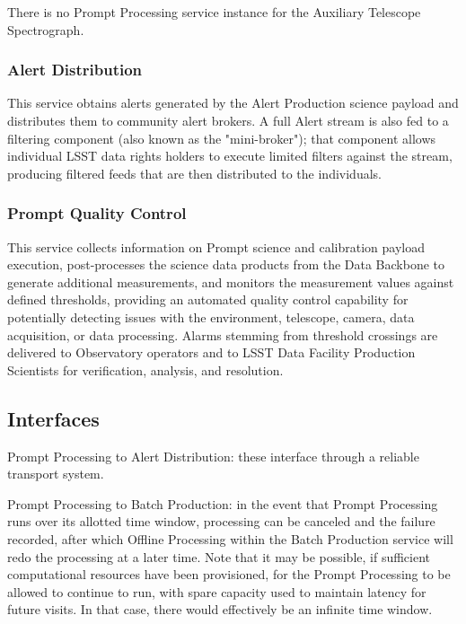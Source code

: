 \documentclass[DM,toc,lsstdraft]{lsstdoc}
\begin{document}
There is no Prompt Processing service instance for the Auxiliary
Telescope Spectrograph.

\subsubsection{Alert Distribution}\label{alert-distribution}

This service obtains alerts generated by the Alert Production science payload and distributes them to community alert brokers.
A full Alert stream is also fed to a filtering component (also known as the "mini-broker"); that component allows individual LSST data rights holders to execute limited filters against the stream, producing filtered feeds that are then distributed to the individuals.

\subsubsection{Prompt Quality Control}\label{prompt-quality-control}

This service collects information on Prompt science and calibration
payload execution, post-processes the science data products from the
Data Backbone to generate additional measurements, and monitors the
measurement values against defined thresholds, providing an automated
quality control capability for potentially detecting issues with the
environment, telescope, camera, data acquisition, or data processing.
Alarms stemming from threshold crossings are delivered to Observatory
operators and to LSST Data Facility Production Scientists for
verification, analysis, and resolution.

\subsection{Interfaces}\label{prompt-us-interfaces}

Prompt Processing to Alert Distribution: these
interface through a reliable transport system.

Prompt Processing to Batch Production: in the event that Prompt
Processing runs over its allotted time window, processing can be
canceled and the failure recorded, after which Offline Processing within
the Batch Production service will
redo the processing at a later time. Note that it may be possible, if
sufficient computational resources have been provisioned, for the Prompt
Processing to be allowed to continue to run, with spare capacity used to
maintain latency for future visits. In that case, there would
effectively be an infinite time window.
\end{document}
